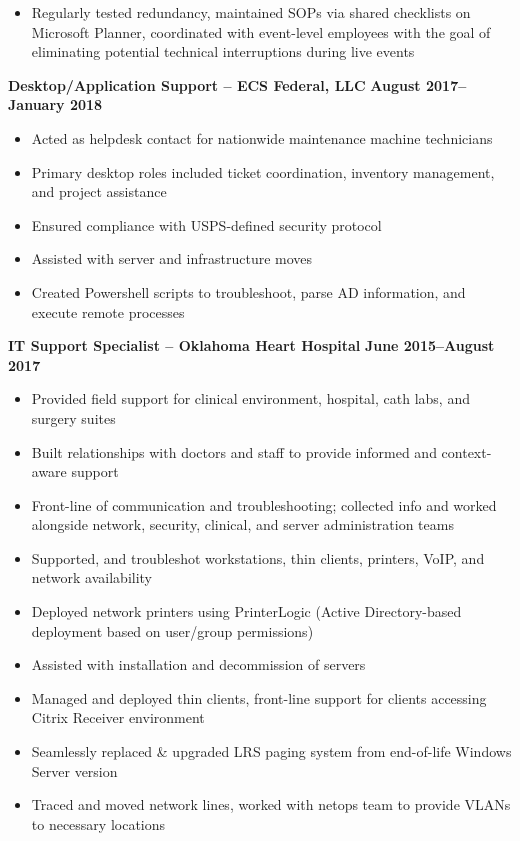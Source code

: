 \documentclass[line]{res}
\begin{document}
\begin{resume}
\begin{itemize}
\begin{itemize}
				\item Regularly tested redundancy, maintained SOPs via shared checklists on Microsoft Planner, coordinated with event-level employees with the goal of eliminating potential technical interruptions during live events
			\end{itemize}
	\end{itemize}
\textbf{Desktop/Application Support -- ECS Federal, LLC}
\newline
\textbf{August 2017--January 2018}
	\begin{itemize}
		\item Acted as helpdesk contact for nationwide maintenance machine technicians
		\item Primary desktop roles included ticket coordination, inventory management, and project assistance
		\item Ensured compliance with USPS-defined security protocol
		\item Assisted with server and infrastructure moves
		\item Created Powershell scripts to troubleshoot, parse AD information, and execute remote processes
	\end{itemize}
\textbf{IT Support Specialist -- Oklahoma Heart Hospital}
\newline
\textbf{June 2015--August 2017}
	\begin{itemize}
		\item Provided field support for clinical environment, hospital, cath labs, and surgery suites
		\item Built relationships with doctors and staff to provide informed and context-aware support
		\item Front-line of communication and troubleshooting; collected info and worked alongside network, security, clinical, and server administration teams
		\item Supported, and troubleshot workstations, thin clients, printers, VoIP, and network availability
		\item Deployed network printers using PrinterLogic (Active Directory-based deployment based on user/group permissions)
		\item Assisted with installation and decommission of servers
		\item Managed and deployed thin clients, front-line support for clients accessing Citrix Receiver environment
		\item Seamlessly replaced \& upgraded LRS paging system from end-of-life Windows Server version
		\item Traced and moved network lines, worked with netops team to provide VLANs to necessary locations

\end{itemize}
\end{resume}
\end{document}

